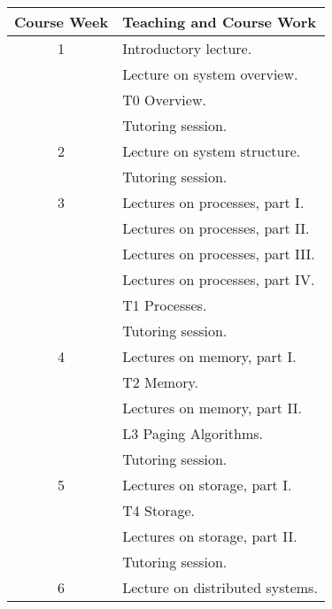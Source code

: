 \documentclass[a4paper,logo]{miunart}
\begin{document}
\begin{table}
  \centering
  \begin{tabular}{cp{10cm}}
    \toprule
    \textbf{Course Week} & \textbf{Teaching and Course Work}\\
    \toprule
    1
        & Introductory lecture.\\
        & Lecture on system overview.\\
        & T0 Overview.\\
        & Tutoring session.\\
    \midrule
    2
        & Lecture on system structure.\\
        & Tutoring session.\\
    \midrule
    3
        & Lectures on processes, part I.\\
        & Lectures on processes, part II.\\
        & Lectures on processes, part III.\\
        & Lectures on processes, part IV.\\
        & T1 Processes.\\
        & Tutoring session.\\
    \midrule
    4
        & Lectures on memory, part I.\\
        & T2 Memory.\\
        & Lectures on memory, part II.\\
        & L3 Paging Algorithms.\\
        & Tutoring session.\\
    \midrule
    5
        & Lectures on storage, part I.\\
        & T4 Storage.\\
        & Lectures on storage, part II.\\
        & Tutoring session.\\
    \midrule
    6
        & Lecture on distributed systems.\\

\end{tabular}
\end{table}
\end{document}
